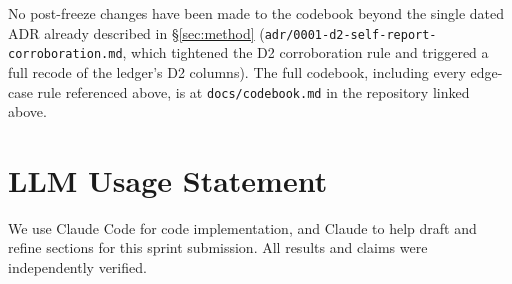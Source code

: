 \documentclass[10pt]{article}
\begin{document}
No post-freeze changes have been made to the codebook beyond the single
dated ADR already described in \S\ref{sec:method}
(\texttt{adr/0001-d2-self-report-corroboration.md}, which tightened the D2
corroboration rule and triggered a full recode of the ledger's D2 columns).
The full codebook, including every edge-case rule referenced above, is at
\texttt{docs/codebook.md} in the repository linked above.

\section*{LLM Usage Statement}

We use Claude Code for code implementation, and Claude to help draft and
refine sections for this sprint submission. All results and claims were
independently verified.
\end{document}
